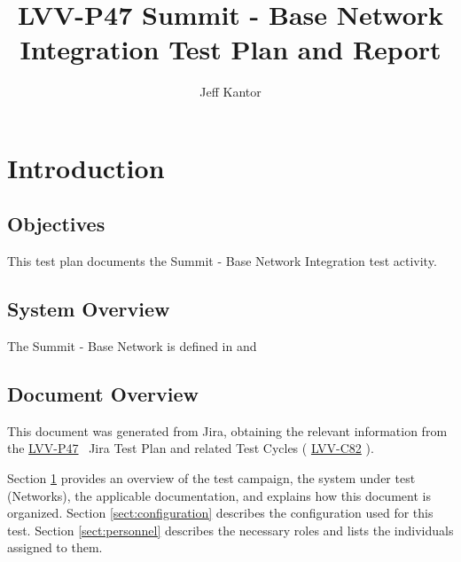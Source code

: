 \documentclass[DM,lsstdraft,STR,toc]{lsstdoc}
\begin{document}
\def\milestoneName{Summit - Base Network Integration}
\def\milestoneId{LVV-P47}
\def\product{Networks}


\title{ LVV-P47 Summit - Base Network Integration Test Plan and Report}
\setDocRef{\lsstDocType-\lsstDocNum}
\date{\vcsdate}
\author{ Jeff Kantor }






\maketitle

\section{Introduction}
\label{sect:intro}


\subsection{Objectives}
\label{sect:objectives}

This test plan documents the Summit - Base Network Integration test
activity.



\subsection{System Overview}
\label{sect:systemoverview}

The Summit - Base Network is defined in  and 


\subsection{Document Overview}
\label{sect:docoverview}

This document was generated from Jira, obtaining the relevant information from the 
\href{https://jira.lsstcorp.org/secure/Tests.jspa#/testPlan/LVV-P47}{LVV-P47}
~Jira Test Plan and related Test Cycles (
  \href{https://jira.lsstcorp.org/secure/Tests.jspa#/testCycle/LVV-C82}{LVV-C82}
).

Section \ref{sect:intro} provides an overview of the test campaign, the system under test (\product{}), the applicable documentation, and explains how this document is organized.
Section \ref{sect:configuration}  describes the configuration used for this test.
Section \ref{sect:personnel} describes the necessary roles and lists the individuals assigned to them.
\end{document}
